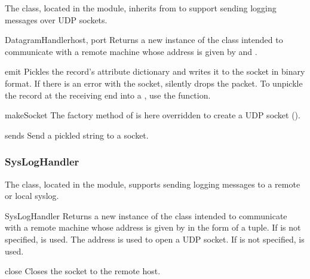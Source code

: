 The  class, located in the
 module, inherits from 
to support sending logging messages over UDP sockets.

\begin{classdesc}{DatagramHandler}{host, port}
Returns a new instance of the  class intended to
communicate with a remote machine whose address is given by 
and .
\end{classdesc}

\begin{methoddesc}{emit}{}
Pickles the record's attribute dictionary and writes it to the socket in
binary format. If there is an error with the socket, silently drops the
packet.
To unpickle the record at the receiving end into a , use the
 function.
\end{methoddesc}

\begin{methoddesc}{makeSocket}{}
The factory method of  is here overridden to create
a UDP socket ().
\end{methoddesc}

\begin{methoddesc}{send}{s}
Send a pickled string to a socket.
\end{methoddesc}

\subsubsection{SysLogHandler}

The  class, located in the
 module, supports sending logging messages to
a remote or local \UNIX{} syslog.

\begin{classdesc}{SysLogHandler}{}
Returns a new instance of the  class intended to
communicate with a remote \UNIX{} machine whose address is given by
 in the form of a 
tuple.  If  is not specified,  is
used.  The address is used to open a UDP socket.  If  is
not specified,  is used.
\end{classdesc}

\begin{methoddesc}{close}{}
Closes the socket to the remote host.
\end{methoddesc}

